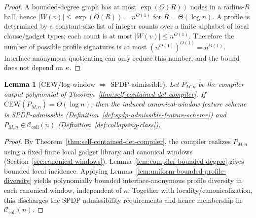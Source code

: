 \documentclass[12pt]{article}
\newcommand{\CEW}{\mathrm{CEW}}
\newtheorem{lemma}[theorem]{Lemma}
\theoremstyle{definition}
\theoremstyle{definition}
\theoremstyle{remark}
\theoremstyle{remark}
\begin{document}
\begin{proof}
A bounded-degree graph has at most $\exp(O(R))$ nodes in a radius-$R$ ball, hence
$|W(v)|\le \exp(O(R)) = n^{O(1)}$ for $R=\Theta(\log n)$.
A profile is determined by a constant-size list of integer counts over a finite
alphabet of local clause/gadget types; each count is at most $|W(v)|\le n^{O(1)}$.
Therefore the number of possible profile signatures is at most $(n^{O(1)})^{O(1)}=n^{O(1)}$.
Interface-anonymous quotienting can only reduce this number, and the bound does not
depend on $\kappa$.
\end{proof}

\begin{lemma}[CEW/log-window $\Rightarrow$ SPDP-admissible]
\label{lem:cew-to-admissible}
Let $P_{M,n}$ be the compiler output polynomial of
Theorem~\ref{thm:self-contained-det-compiler}. If $\CEW(P_{M,n})=O(\log n)$,
then the induced canonical-window feature scheme is SPDP-admissible
(Definition~\ref{def:spdp-admissible-feature-scheme}) and
$P_{M,n}\in \mathcal{C}_{\mathrm{coll}}(n)$
(Definition~\ref{def:collapsing-class}).
\end{lemma}

\begin{proof}
By Theorem~\ref{thm:self-contained-det-compiler}, the compiler realizes $P_{M,n}$
using a fixed finite local gadget library and canonical windows
(Section~\ref{sec:canonical-windows}). Lemma~\ref{lem:compiler-bounded-degree} gives
bounded local incidence. Applying Lemma~\ref{lem:uniform-bounded-profile-diversity}
yields polynomially bounded interface-anonymous profile diversity in each canonical
window, independent of $\kappa$. Together with locality/canonicalization, this discharges
the SPDP-admissibility requirements and hence membership in $\mathcal{C}_{\mathrm{coll}}(n)$.
\end{proof}
\end{document}
